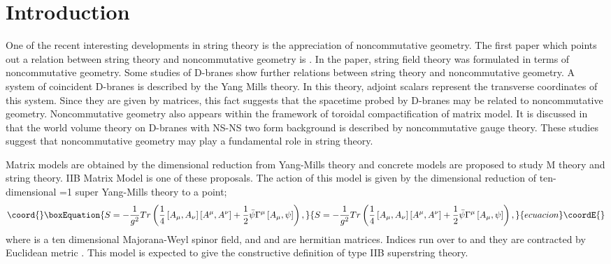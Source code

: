 \documentclass[a4paper,11pt]{article}
\begin{document}
\newpage 

\section{Introduction}

\hspace{0.4cm}
One of the recent interesting developments in string theory is the 
appreciation of noncommutative geometry. 
The first paper which points out a relation 
between string theory and noncommutative geometry 
is \cite{wittenopensft}. 
In the paper, string field theory was formulated in terms 
of noncommutative geometry. 
Some studies of D-branes 
show further relations between string theory and 
noncommutative geometry.  
A system of \coordHE{} coincident D-branes 
is described by the \coordHE{} Yang Mills theory. 
In this theory, \coordHE{} adjoint scalars represent 
the transverse coordinates of this system. 
Since they are given by \coordHE{} matrices, this fact suggests that 
the spacetime probed by D-branes may be 
related to noncommutative geometry. 
Noncommutative geometry also appears 
within the framework of toroidal compactification 
of matrix model\cite{CDS}. 
It is discussed in \cite{SW} that 
the world volume theory on D-branes with NS-NS two form  
background is described by noncommutative gauge theory. 
These studies suggest that noncommutative geometry 
may play a fundamental role in string theory. 

Matrix models are obtained by the dimensional 
reduction from Yang-Mills theory and 
concrete models\cite{BFSS,IKKT} are proposed to study 
M theory and string theory. 
IIB Matrix Model\cite{IKKT} is one of these proposals.
The action of this model is given by the dimensional reduction 
of ten-dimensional \coordHE{}=1 \coordHE{} super Yang-Mills theory 
to a point; 
\begin{equation}\coord{}\boxEquation{
 S= -\frac{1}{g^{2}} Tr \left( \frac{1}{4} \left[ A_{\mu} ,A_{\nu}\right] 
         \left[A^{\mu} ,A^{\nu} \right]  
  +\frac{1}{2}\bar{\psi } \Gamma^{\mu} \left[ A_{\mu},\psi \right] \right) , 
}{
 S= -\frac{1}{g^{2}} Tr \left( \frac{1}{4} \left[ A_{\mu} ,A_{\nu}\right] 
         \left[A^{\mu} ,A^{\nu} \right]  
  +\frac{1}{2}\bar{\psi } \Gamma^{\mu} \left[ A_{\mu},\psi \right] \right) , 
}{ecuacion}\coordE{}\end{equation}
where \myHighlight{$\psi$}\coordHE{} is a ten dimensional Majorana-Weyl spinor field, 
and \coordHE{} and \myHighlight{$\psi$}\coordHE{} are \coordHE{} hermitian matrices. 
Indices \myHighlight{$\mu,\nu$}\coordHE{} run over \coordHE{} to \coordHE{} and they are contracted by 
Euclidean metric \myHighlight{$\delta_{\mu\nu}$}\coordHE{}. 
This model is expected to give the constructive definition of 
type IIB superstring theory\cite{AIKKTT}. 
\end{document}
